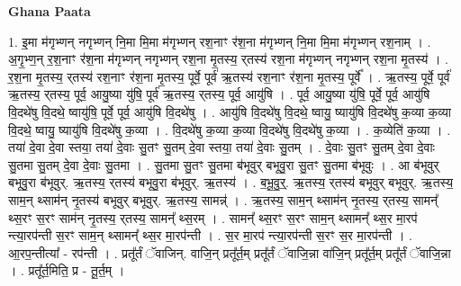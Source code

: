 \documentclass[17pt]{extarticle}
\begin{document}
\textbf{Ghana Paata } \newline

1. इ॒मा म॑गृभ्णन् नगृभ्णन् नि॒मा मि॒मा म॑गृभ्णन् रश॒नाꣳ र॑श॒ना म॑गृभ्णन् नि॒मा मि॒मा म॑गृभ्णन् रश॒नाम् । . अ॒गृ॒भ्ण॒न् र॒श॒नाꣳ र॑श॒ना म॑गृभ्णन् नगृभ्णन् रश॒ना मृ॒तस्य॒ र्‌तस्य॑ रश॒ना म॑गृभ्णन् नगृभ्णन् रश॒ना मृ॒तस्य॑ । . र॒श॒ना मृ॒तस्य॒ र्‌तस्य॑ रश॒नाꣳ र॑श॒ना मृ॒तस्य॒ पूर्वे॒ पूर्व॑ ऋ॒तस्य॑ रश॒नाꣳ र॑श॒ना मृ॒तस्य॒ पूर्वे᳚ । . ऋ॒तस्य॒ पूर्वे॒ पूर्व॑ ऋ॒तस्य॒ र्‌तस्य॒ पूर्व॒ आयु॒ष्या यु॑षि॒ पूर्व॑ ऋ॒तस्य॒ र्‌तस्य॒ पूर्व॒ आयु॑षि । . पूर्व॒ आयु॒ष्या यु॑षि॒ पूर्वे॒ पूर्व॒ आयु॑षि वि॒दथे॑षु वि॒दथे॒ ष्वायु॑षि॒ पूर्वे॒ पूर्व॒ आयु॑षि वि॒दथे॑षु । . आयु॑षि वि॒दथे॑षु वि॒दथे॒ ष्वायु॒ ष्यायु॑षि वि॒दथे॑षु क॒व्या क॒व्या वि॒दथे॒ ष्वायु॒ ष्यायु॑षि वि॒दथे॑षु क॒व्या । . वि॒दथे॑षु क॒व्या क॒व्या वि॒दथे॑षु वि॒दथे॑षु क॒व्या । . क॒व्येति॑ क॒व्या । . तया॑ दे॒वा दे॒वा स्तया॒ तया॑ दे॒वाः सु॒तꣳ सु॒तम् दे॒वा स्तया॒ तया॑ दे॒वाः सु॒तम् । . दे॒वाः सु॒तꣳ सु॒तम् दे॒वा दे॒वाः सु॒तमा सु॒तम् दे॒वा दे॒वाः सु॒तमा । . सु॒तमा सु॒तꣳ सु॒तमा ब॑भूवुर् बभूवु॒रा सु॒तꣳ सु॒तमा ब॑भूवुः । . आ ब॑भूवुर् बभूवु॒रा ब॑भूवुर्. ऋ॒तस्य॒ र्‌तस्य॑ बभूवु॒रा ब॑भूवुर्. ऋ॒तस्य॑ । . ब॒भू॒वु॒र्॒. ऋ॒तस्य॒ र्‌तस्य॑ बभूवुर् बभूवुर्. ऋ॒तस्य॒ साम॒न् थ्साम॑न् नृ॒तस्य॑ बभूवुर् बभूवुर्. ऋ॒तस्य॒ सामन्न्॑ । . ऋ॒तस्य॒ साम॒न् थ्साम॑न् नृ॒तस्य॒ र्‌तस्य॒ सामन्᳚ थ्स॒रꣳ स॒रꣳ साम॑न् नृ॒तस्य॒ र्‌तस्य॒ सामन्᳚ थ्स॒रम् । . सामन्᳚ थ्स॒रꣳ स॒रꣳ साम॒न् थ्सामन्᳚ थ्स॒र मा॒रप॑ न्त्या॒रप॑न्ती स॒रꣳ साम॒न् थ्सामन्᳚ थ्स॒र मा॒रप॑न्ती । . स॒र मा॒रप॑ न्त्या॒रप॑न्ती स॒रꣳ स॒र मा॒रप॑न्ती । . आ॒रप॒न्तीत्या᳚ - रप॑न्ती । . प्रतू᳚र्तं ॅवाजिन्. वाजि॒न् प्रतू᳚र्त॒म् प्रतू᳚र्तं ॅवाजि॒न्ना वा॑जि॒न् प्रतू᳚र्त॒म् प्रतू᳚र्तं ॅवाजि॒न्ना । . प्रतू᳚र्त॒मिति॒ प्र - तू॒र्त॒म् । \newline
\end{document}
